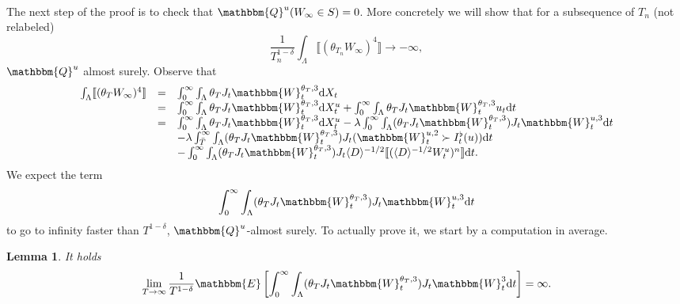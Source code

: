 \documentclass[11pt]{article}
\newcommand{\mathd}{\mathrm{d}}
\newtheorem{lemma}{Lemma}
\begin{document}
\

The next step of the proof is to check that $\mathbbm{Q}^u (W_{\infty} \in S)
= 0$. More concretely we will show that for a subsequence of $T_n$ (not
relabeled)
\[ \frac{1}{T_n^{1 - \delta}} \int_{\Lambda} \llbracket (\theta_{T_n}
   W_{\infty})^4 \rrbracket \rightarrow - \infty, \]
$\mathbbm{Q}^u$ almost surely. Observe that
\[ \begin{array}{lll}
     \int_{\Lambda} \llbracket (\theta_T W_{\infty})^4 \rrbracket & = &
     \int^{\infty}_0 \int_{\Lambda} \theta_T J_t \mathbbm{W}_t^{\theta_T, 3}
     \mathd X_t\\
     & = & \int^{\infty}_0 \int_{\Lambda} \theta_T J_t
     \mathbbm{W}_t^{\theta_T, 3} \mathd X^u_t + \int^{\infty}_0 \int_{\Lambda}
     \theta_T J_t \mathbbm{W}_t^{\theta_T, 3} u_t \mathd t\\
     & = & \int^{\infty}_0 \int_{\Lambda} \theta_T J_t
     \mathbbm{W}_t^{\theta_T, 3} \mathd X^u_t - \lambda \int^{\infty}_0
     \int_{\Lambda} (\theta_T J_t \mathbbm{W}_t^{\theta_T, 3}) J_t
     \mathbbm{W}_t^{u, 3} \mathd t\\
     &  & - \lambda \int^{\infty}_{\bar{T}} \int_{\Lambda} (\theta_T J_t
     \mathbbm{W}_t^{\theta_T, 3}) J_t (\mathbbm{W}_t^{u, 2} \succ I^{\flat}_t
     (u)) \mathd t\\
     &  & - \int^{\infty}_0 \int_{\Lambda} (\theta_T J_t
     \mathbbm{W}_t^{\theta_T, 3}) J_t \langle D \rangle^{- 1 / 2} \llbracket
     (\langle D \rangle^{- 1 / 2} W^u_t)^n \rrbracket \mathd t.
   \end{array} \]
\[ \  \]
We expect the term
\[ \int^{\infty}_0 \int_{\Lambda} (\theta_T J_t \mathbbm{W}_t^{\theta_T, 3})
   J_t \mathbbm{W}_t^{u, 3} \mathd t \]
to go to infinity faster than $T^{1 - \delta}$, $\mathbbm{Q}^u$-almost surely.
To actually prove it, we start by a computation in average.

\begin{lemma}
  It holds
  \[ \lim_{T \rightarrow \infty} \frac{1}{T^{1 - \delta}} \mathbbm{E} \left[
     \int^{\infty}_0 \int_{\Lambda} (\theta_T J_t \mathbbm{W}_t^{\theta_T, 3})
     J_t \mathbbm{W}_t^3 \mathd t \right] = \infty . \]
\end{lemma}
\end{document}
